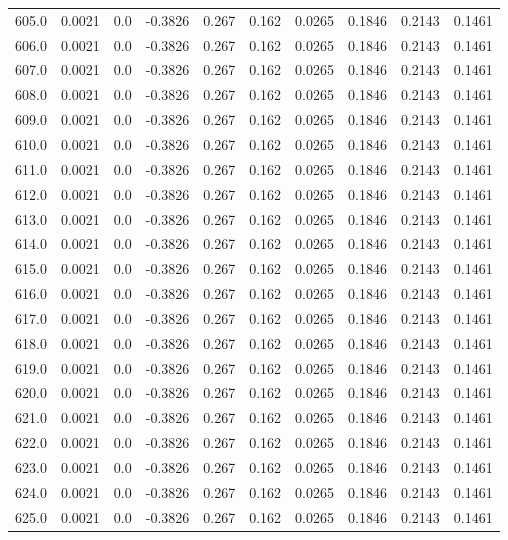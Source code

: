 \begin{longtable}{lrrrrrrrrr}
605.0 & 0.0021 & 0.0 & -0.3826 & 0.267 & 0.162 & 0.0265 & 0.1846 & 0.2143 & 0.1461 \\
606.0 & 0.0021 & 0.0 & -0.3826 & 0.267 & 0.162 & 0.0265 & 0.1846 & 0.2143 & 0.1461 \\
607.0 & 0.0021 & 0.0 & -0.3826 & 0.267 & 0.162 & 0.0265 & 0.1846 & 0.2143 & 0.1461 \\
608.0 & 0.0021 & 0.0 & -0.3826 & 0.267 & 0.162 & 0.0265 & 0.1846 & 0.2143 & 0.1461 \\
609.0 & 0.0021 & 0.0 & -0.3826 & 0.267 & 0.162 & 0.0265 & 0.1846 & 0.2143 & 0.1461 \\
610.0 & 0.0021 & 0.0 & -0.3826 & 0.267 & 0.162 & 0.0265 & 0.1846 & 0.2143 & 0.1461 \\
611.0 & 0.0021 & 0.0 & -0.3826 & 0.267 & 0.162 & 0.0265 & 0.1846 & 0.2143 & 0.1461 \\
612.0 & 0.0021 & 0.0 & -0.3826 & 0.267 & 0.162 & 0.0265 & 0.1846 & 0.2143 & 0.1461 \\
613.0 & 0.0021 & 0.0 & -0.3826 & 0.267 & 0.162 & 0.0265 & 0.1846 & 0.2143 & 0.1461 \\
614.0 & 0.0021 & 0.0 & -0.3826 & 0.267 & 0.162 & 0.0265 & 0.1846 & 0.2143 & 0.1461 \\
615.0 & 0.0021 & 0.0 & -0.3826 & 0.267 & 0.162 & 0.0265 & 0.1846 & 0.2143 & 0.1461 \\
616.0 & 0.0021 & 0.0 & -0.3826 & 0.267 & 0.162 & 0.0265 & 0.1846 & 0.2143 & 0.1461 \\
617.0 & 0.0021 & 0.0 & -0.3826 & 0.267 & 0.162 & 0.0265 & 0.1846 & 0.2143 & 0.1461 \\
618.0 & 0.0021 & 0.0 & -0.3826 & 0.267 & 0.162 & 0.0265 & 0.1846 & 0.2143 & 0.1461 \\
619.0 & 0.0021 & 0.0 & -0.3826 & 0.267 & 0.162 & 0.0265 & 0.1846 & 0.2143 & 0.1461 \\
620.0 & 0.0021 & 0.0 & -0.3826 & 0.267 & 0.162 & 0.0265 & 0.1846 & 0.2143 & 0.1461 \\
621.0 & 0.0021 & 0.0 & -0.3826 & 0.267 & 0.162 & 0.0265 & 0.1846 & 0.2143 & 0.1461 \\
622.0 & 0.0021 & 0.0 & -0.3826 & 0.267 & 0.162 & 0.0265 & 0.1846 & 0.2143 & 0.1461 \\
623.0 & 0.0021 & 0.0 & -0.3826 & 0.267 & 0.162 & 0.0265 & 0.1846 & 0.2143 & 0.1461 \\
624.0 & 0.0021 & 0.0 & -0.3826 & 0.267 & 0.162 & 0.0265 & 0.1846 & 0.2143 & 0.1461 \\
625.0 & 0.0021 & 0.0 & -0.3826 & 0.267 & 0.162 & 0.0265 & 0.1846 & 0.2143 & 0.1461 \\

\end{longtable}
